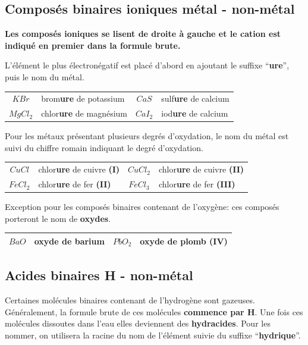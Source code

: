 \documentclass[
  11pt,
  french,
  a4paper,
  openany]{book}
\begin{document}
\hypertarget{composuxe9s-binaires-ioniques-muxe9tal---non-muxe9tal}{%
\subsection{Composés binaires ioniques \textbar{} métal - non-métal}\label{composuxe9s-binaires-ioniques-muxe9tal---non-muxe9tal}}

\textbf{Les composés ioniques se lisent de droite à gauche et le cation est indiqué en premier dans la formule brute.}

L'élément le plus électronégatif est placé d'abord en ajoutant le suffixe ``\textbf{ure}'', puis le nom du métal.

\begin{longtable}[]{@{}clcl@{}}
\toprule
\endhead
\(KBr\) & brom\textbf{ure} de potassium & \(CaS\) & sulf\textbf{ure} de calcium\tabularnewline
\(MgCl_2\) & chlor\textbf{ure} de magnésium & \(CaI_2\) & iod\textbf{ure} de calcium\tabularnewline
\bottomrule
\end{longtable}

Pour les métaux présentant plusieurs degrés d'oxydation, le nom du métal est suivi du chiffre romain indiquant le degré d'oxydation.

\begin{longtable}[]{@{}clcl@{}}
\toprule
\endhead
\(CuCl\) & chlor\textbf{ure} de cuivre \textbf{(I)} & \(CuCl_2\) & chlor\textbf{ure} de cuivre \textbf{(II)}\tabularnewline
\(FeCl_2\) & chlor\textbf{ure} de fer \textbf{(II)} & \(FeCl_3\) & chlor\textbf{ure} de fer \textbf{(III)}\tabularnewline
\bottomrule
\end{longtable}

Exception pour les composés binaires contenant de l'oxygène: ces composés porteront le nom de \textbf{oxydes}.

\begin{longtable}[]{@{}clcl@{}}
\toprule
\endhead
\(BaO\) & \textbf{oxyde} de barium & \(PbO_2\) & \textbf{oxyde} de plomb \textbf{(IV)}\tabularnewline
\bottomrule
\end{longtable}

\hypertarget{acides-binaires-h---non-muxe9tal}{%
\subsection{Acides binaires \textbar{} H - non-métal}\label{acides-binaires-h---non-muxe9tal}}

Certaines molécules binaires contenant de l'hydrogène sont gazeuses. Généralement, la formule brute de ces molécules \textbf{commence par H}. Une fois ces molécules dissoutes dans l'eau elles deviennent des \textbf{hydracides}. Pour les nommer, on utilisera la racine du nom de l'élément suivie du suffixe ``\textbf{hydrique}''.
\end{document}
